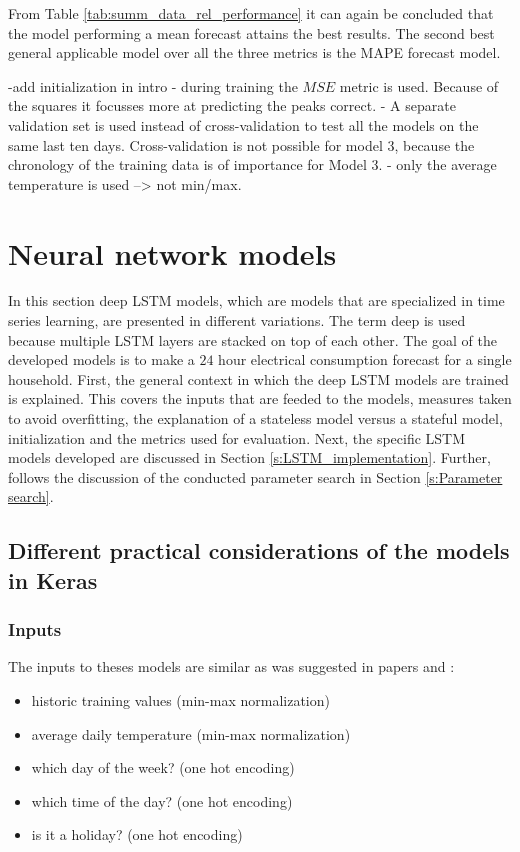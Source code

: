 From Table \ref{tab:summ_data_rel_performance} it can again be concluded that the model performing a mean forecast attains the best results. The second best general applicable model over all the three metrics is the MAPE forecast model.

-add initialization in intro
- during training the $ MSE $ metric is used. Because of the squares it focusses more at predicting the peaks correct. 
- A separate validation set is used instead of cross-validation to test all the models on the same last ten days. Cross-validation is not possible for model 3, because the chronology of the training data is of importance for Model 3. 
- only the average temperature is used --> not min/max. 


\section{Neural network models}\label{s:Neural network models}
In this section deep LSTM models, which are models that are specialized in time series learning, are presented in different variations. The term deep is used because multiple LSTM layers are stacked on top of each other. The goal of the developed models is to make a $ 24 $ hour electrical consumption forecast for a single household. First, the general context in which the deep LSTM models are trained is explained. This covers the inputs that are feeded to the models, measures taken to avoid overfitting, the explanation of a stateless model versus a stateful model, initialization and the metrics used for evaluation. Next, the specific LSTM models developed are discussed in Section \ref{s:LSTM_implementation}. Further, follows  the discussion of the conducted parameter search in Section \ref{s:Parameter search}.

\subsection{Different practical considerations of the models in Keras}

\subsubsection{Inputs}\label{s:Inputs}
The inputs to theses models are similar as was suggested in papers \cite{loadforecastingmoor} and \cite{Kong2019}: 
\begin{itemize}
	\item historic training values (min-max normalization)
	\item average daily temperature (min-max normalization)
	\item which day of the week? (one hot encoding)
	\item which time of the day? (one hot encoding)
	\item is it a holiday? (one hot encoding)
\end{itemize}

